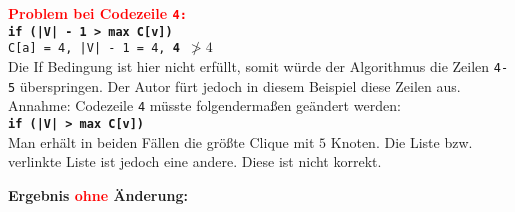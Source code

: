 \documentclass[12pt, xcolor=dvipsnames]{scrartcl}
\theoremstyle{definition}
\theoremstyle{definition}
\begin{document}

          \textbf{\textcolor{red}{Problem bei Codezeile \texttt{4:}}} \\
          \textbf{\texttt{if (|V| - 1 > max C[v])}} \\
          \texttt{C[a] = 4, |V| - 1 = 4, \textbf{4 $\ngtr 4$}} \\

          Die If Bedingung ist hier nicht erfüllt, somit würde der Algorithmus die Zeilen \texttt{4-5} überspringen. Der Autor fürt jedoch in diesem Beispiel diese Zeilen aus. \\
          Annahme: Codezeile \texttt{4} müsste folgendermaßen geändert werden:\\
          \textbf{\texttt{if (|V| > max C[v])}} \\
          Man erhält in beiden Fällen die größte Clique mit $5$ Knoten.
          Die Liste bzw. verlinkte Liste ist jedoch eine andere. Diese ist nicht korrekt. 
          
          \textbf{Ergebnis \textcolor{red}{ohne} Änderung:}
\end{document}
